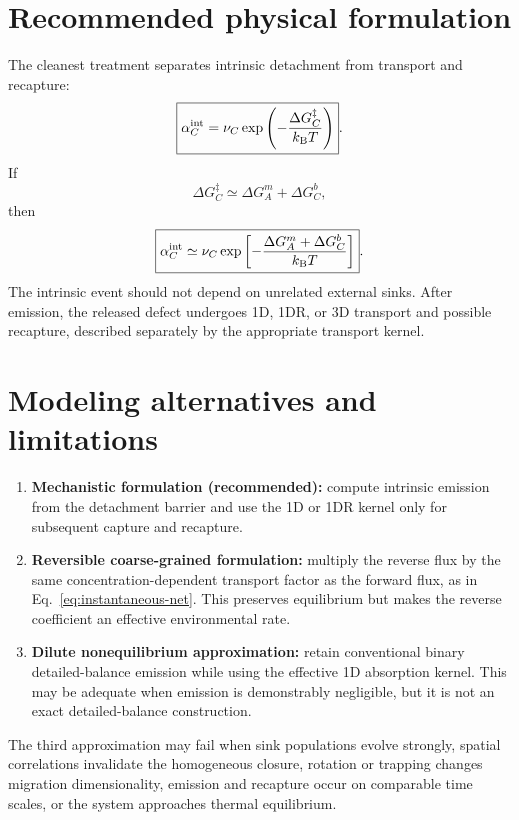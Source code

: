 \documentclass[11pt]{article}
\newcommand{\bint}{\mathrm{int}}
\begin{document}
\section{Recommended physical formulation}
The cleanest treatment separates intrinsic detachment from transport and
recapture:
\begin{equation}
 \boxed{\alpha_C^{\bint}
 =\nu_C\exp\left(-\frac{\Delta G_C^\ddagger}{k_{\rm B}T}\right)}.
 \label{eq:intrinsic}
\end{equation}
If
\[
 \Delta G_C^\ddagger\simeq\Delta G_A^m+\Delta G_C^b,
\]
then
\begin{equation}
 \boxed{\alpha_C^{\bint}\simeq\nu_C
 \exp\left[-\frac{\Delta G_A^m+\Delta G_C^b}{k_{\rm B}T}\right]}.
\end{equation}
The intrinsic event should not depend on unrelated external sinks. After
emission, the released defect undergoes 1D, 1DR, or 3D transport and possible
recapture, described separately by the appropriate transport kernel.

\section{Modeling alternatives and limitations}
\begin{enumerate}
 \item \textbf{Mechanistic formulation (recommended):} compute intrinsic
 emission from the detachment barrier and use the 1D or 1DR kernel only for
 subsequent capture and recapture.
 \item \textbf{Reversible coarse-grained formulation:} multiply the reverse
 flux by the same concentration-dependent transport factor as the forward
 flux, as in Eq.~\eqref{eq:instantaneous-net}. This preserves equilibrium but
 makes the reverse coefficient an effective environmental rate.
 \item \textbf{Dilute nonequilibrium approximation:} retain conventional
 binary detailed-balance emission while using the effective 1D absorption
 kernel. This may be adequate when emission is demonstrably negligible, but
 it is not an exact detailed-balance construction.
\end{enumerate}
The third approximation may fail when sink populations evolve strongly,
spatial correlations invalidate the homogeneous closure, rotation or trapping
changes migration dimensionality, emission and recapture occur on comparable
time scales, or the system approaches thermal equilibrium.
\end{document}
